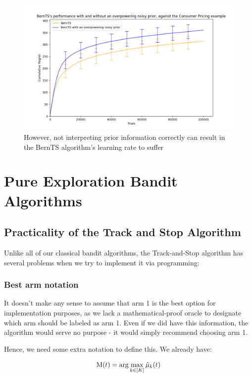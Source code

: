 \begin{figure}[h!]
    \centering
    \includegraphics[width=17cm]{report/images/BernTS-bad-priors-cp.png}
    \caption{However, not interpreting prior information correctly can result in the BernTS algorithm's learning rate to suffer}
    \label{fig:bernts-bad-prior}
\end{figure}


\section{Pure Exploration Bandit Algorithms}

\subsection{Practicality of the Track and Stop Algorithm}

Unlike all of our classical bandit algorithms, the Track-and-Stop algorithm has several problems when we try to implement it via programming:

\subsubsection{Best arm notation}

It doesn't make any sense to assume that arm 1 is the best option for implementation purposes, as we lack a mathematical-proof oracle to designate which arm should be labeled as arm 1. Even if we did have this information, the algorithm would serve no purpose - it would simply recommend choosing arm 1.

Hence, we need some extra notation to define this. We already have:

$$\mathrm{M}(t) = \arg\max\limits_{k \in [K]}{\hat{\mu}_{k}(t)}$$

